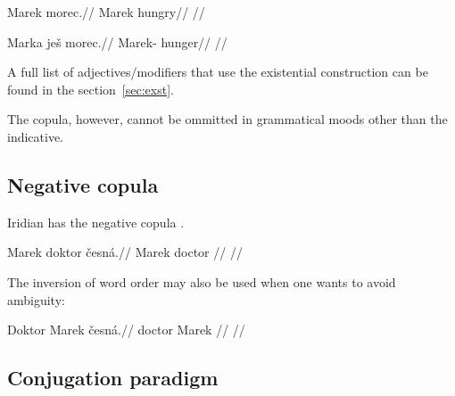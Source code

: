 \pex
\begingl
\gla *Marek morec.//
\glb Marek hungry//
\glft {}//
\endgl
\xe


\pex
\begingl
\gla Marka je\v{s} morec.//
\glb Marek-  hunger//
\glft {}//
\endgl
\xe

A full list of adjectives/modifiers that use the existential construction can be found in the section~\ref{sec:exst}.

The copula, however, cannot be ommitted in grammatical moods other than the indicative.

\subsection{Negative copula}

Iridian has the negative copula .

\pex
\begingl
\gla Marek doktor \v{c}esná.//
\glb Marek doctor //
\glft {}//
\endgl
\xe

\par The inversion of word order may also be used when one wants to avoid ambiguity:

\pex
\begingl
\gla Doktor Marek \v{c}esná.//
\glb doctor Marek //
\glft {}//
\endgl
\xe


\subsection{Conjugation paradigm}
